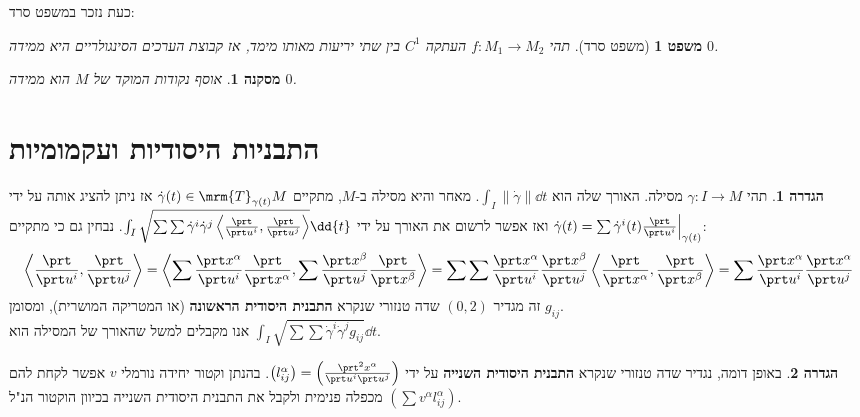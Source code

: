 \documentclass{article}
\newtheorem{corollary}{מסקנה}
\newtheorem*{theorem*}{משפט}
\theoremstyle{definition}
\newtheorem*{definition*}{הגדרה}
\newcommand{\norm}[1]{\left\lVert#1\right\rVert}
\begin{document}
	כעת נזכר במשפט סרד:
	\begin{theorem*}[משפט סרד]
		תהי
		\(f:M_1\to M_2\)
		העתקה
		\(C^1\)
		בין שתי יריעות מאותו מימד,
		אז קבוצת הערכים הסינגולריים היא ממידה \(0\).
	\end{theorem*}

	\begin{corollary}\label{measure-zero}
		אוסף נקודות המוקד של \(M\) הוא ממידה \(0\).
	\end{corollary}




	\section{התבניות היסודיות ועקמומיות}
	
	\begin{definition*}
		תהי
		\(\gamma: I \to M\)
		מסילה.
		האורך שלה הוא
		\(\int_I \norm{\dot\gamma} \dd{t}\).
		מאחר והיא מסילה ב-\(M\), מתקיים
		\(\dot\gamma(t) \in \mrm{T}_{\gamma(t)} M\)
		אז ניתן להציג אותה על ידי
		\(\dot\gamma(t)=\sum \dot{\gamma}^i(t) \frac{\prt}{\prt u^i}\Big|_{\gamma(t)} \)
		ואז אפשר לרשום את האורך על ידי
		\(\int_I \sqrt{
			\sum \sum \dot{\gamma}^i \dot{\gamma}^j \left\langle \frac{\prt}{\prt u^i},\frac{\prt}{\prt u^j} \right\rangle
		} \dd{t}\).
		נבחין גם כי מתקיים:
		\[
			\left\langle \frac{\prt}{\prt u^i},\frac{\prt}{\prt u^j} \right\rangle
			=
			\left\langle
				\sum \frac{\prt x^\alpha}{\prt u^i} \frac{\prt}{\prt x^\alpha},
				\sum \frac{\prt x^\beta}{\prt u^j} \frac{\prt}{\prt x^\beta}
			\right\rangle
			=
			\sum \sum \frac{\prt x^\alpha}{\prt u^i} \frac{\prt x^\beta}{\prt u^j}
			\left\langle \frac{\prt}{\prt x^\alpha}, \frac{\prt}{\prt x^\beta} \right\rangle
			=
			\sum \frac{\prt x^\alpha}{\prt u^i} \frac{\prt x^\alpha}{\prt u^j}
		\]
		זה מגדיר
		\((0,2)\)
		שדה טנזורי שנקרא \textbf{התבנית היסודית הראשונה} (או המטריקה המושרית), ומסומן
		\(g_{ij}\).
		\\
		אנו מקבלים למשל שהאורך של המסילה הוא
		\(\int_I \sqrt{
			\sum \sum \dot{\gamma}^i \dot{\gamma}^j g_{ij}
		} \dd{t}\).
	\end{definition*}

	\begin{definition*}
		באופן דומה, נגדיר שדה טנזורי שנקרא \textbf{התבנית היסודית השנייה} על ידי
		\(\left(l_{ij}^\alpha\right) = \left(\frac{\prt^2 x^\alpha}{\prt u^i \prt u^j}\right)\).
		בהנתן וקטור יחידה נורמלי \(v\) אפשר לקחת להם מכפלה פנימית ולקבל את התבנית היסודית השנייה בכיוון הוקטור הנ"ל
		\(\left(\sum v^\alpha l_{ij}^\alpha\right)\).
	\end{definition*}
\end{document}
